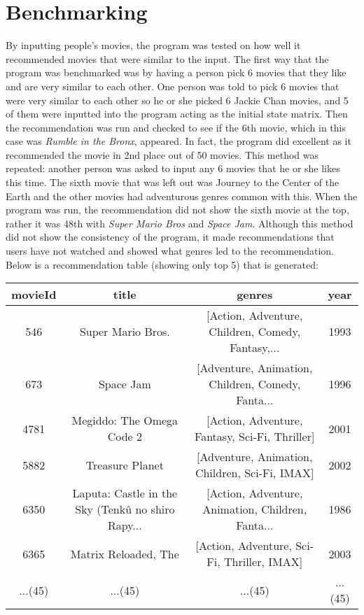 \documentclass{article}
\begin{document}
\section{Benchmarking}
By inputting people's movies, the program was tested on how well it recommended movies that were similar to the input. 
The first way that the program was benchmarked was by having a person pick 6 movies that they like and are very similar to each other.
One person was told to pick 6 movies that were very similar to each other so he or she picked 6 Jackie Chan movies,
and 5 of them were inputted into the program acting as the initial state matrix. Then the 
recommendation was run and checked to see if the 6th movie, which in this case was \emph{Rumble in the Bronx}, appeared. In fact, the 
program did excellent as it recommended the movie in 2nd place out of 50 movies. This method was repeated: another person was asked to input 
any 6 movies that he or she likes this time. The sixth movie that was left out was Journey to the Center of the Earth and the other movies
had adventurous genres common with this. When the program was run, the recommendation did not show the sixth movie at the top, rather it was 48th with
\emph{Super Mario Bros} and \emph{Space Jam}. Although this method did not show the consistency of the program, it made recommendations that users have not watched
and showed what genres led to the recommendation.\\
Below is a recommendation table (showing only top 5) that is generated: 
\begin{center}
    \begin{adjustwidth}{-3.5cm}{}
    \begin{tabular}{||c c c c||}
        \hline
        movieId & title & genres & year \\ [0.5ex] 
        \hline\hline
        546 & Super Mario Bros. & [Action, Adventure, Children, Comedy, Fantasy,... & 1993 \\ 
        \hline
        673 & Space Jam & [Adventure, Animation, Children, Comedy, Fanta... & 1996 \\ 
        \hline
        4781 & Megiddo: The Omega Code 2 & [Action, Adventure, Fantasy, Sci-Fi, Thriller] & 2001 \\ 
        \hline
        5882 & Treasure Planet & [Adventure, Animation, Children, Sci-Fi, IMAX] & 2002 \\ 
        \hline
        6350 & Laputa: Castle in the Sky (Tenkû no shiro Rapy... & [Action, Adventure, Animation, Children, Fanta... & 1986 \\ 
        \hline
        6365 & Matrix Reloaded, The & [Action, Adventure, Sci-Fi, Thriller, IMAX] & 2003 \\ [1ex] 
        \hline
        ...(45) & ...(45) & ...(45) & ...(45) \\
        \hline
    \end{tabular}
    \end{adjustwidth}
    \end{center}
\end{document}
